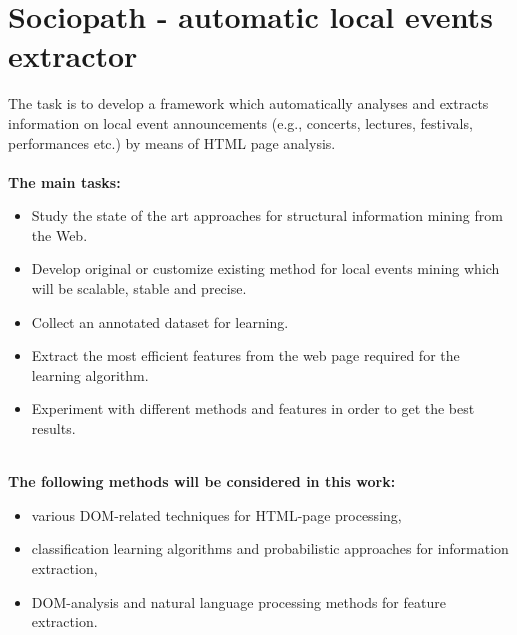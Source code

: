  \cleardoublepage \thispagestyle{empty}

\chapter*{Sociopath - automatic local events extractor}

The task is to develop a framework which automatically analyses and extracts information on local event announcements (e.g., concerts, lectures, festivals, performances etc.) by means of HTML page analysis.
\\
\\
\textbf {The main tasks:}

\begin{itemize}
\item Study the state of the art approaches for structural information mining from the Web.
\item Develop original or customize existing method for local events mining which will be scalable, stable and precise.
\item Collect an annotated dataset for learning.
\item Extract the most efficient features from the web page required for the learning algorithm.
\item Experiment with different methods and features in order to get the best results. 
\end{itemize}
\\
\textbf{The following methods will be considered in this work:}

\begin{itemize}
\item various DOM-related techniques for HTML-page processing,
\item classification learning algorithms and probabilistic approaches for information extraction,
\item DOM-analysis and natural language processing methods for feature extraction.
\end{itemize}
